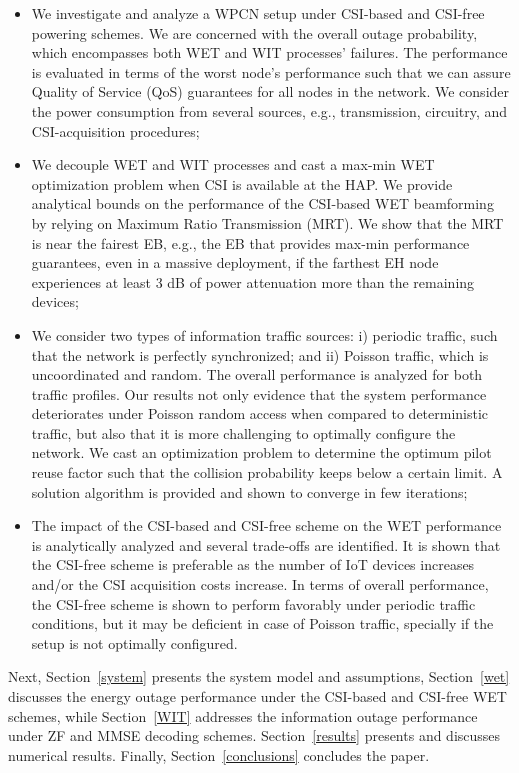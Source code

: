 \documentclass[10pt,journal,a4paper]{IEEEtran}
\begin{document}
	\begin{itemize}
		\item We investigate and analyze a WPCN setup under CSI-based and CSI-free powering schemes. We are concerned with the overall outage probability, which encompasses both WET and WIT processes' failures. 
		The performance is evaluated in terms of the worst node's performance such that we can assure Quality of Service (QoS) guarantees for all nodes in the network. We consider the power consumption from several sources, e.g., transmission, circuitry, and CSI-acquisition procedures;
		\item We decouple WET and WIT processes and cast a max-min WET optimization problem when CSI is available at the HAP. 
		We provide analytical bounds on the performance of the CSI-based WET beamforming by relying on Maximum Ratio Transmission (MRT). We show that the MRT is near the fairest EB, e.g., the EB that provides max-min performance guarantees, even in a massive deployment, if the farthest EH node experiences at least 3 dB of power attenuation more than the remaining devices;
		\item We consider two types of information traffic sources: i) periodic traffic, such that the network is perfectly synchronized; and ii) Poisson traffic, which is uncoordinated and random. The overall performance is analyzed for both traffic profiles. Our results not only evidence that the system performance deteriorates under Poisson random access when compared to deterministic traffic, but also that it is more challenging to optimally configure the network. We cast an optimization problem to determine the optimum pilot reuse factor such that the collision probability keeps below a certain limit. A solution algorithm is provided and shown to converge in few iterations;
		\item The impact of the CSI-based and CSI-free scheme on the WET performance is analytically analyzed and several trade-offs are identified. It is shown that the CSI-free scheme is preferable as the number of IoT devices increases and/or the CSI acquisition costs increase. In terms of overall performance, the CSI-free scheme is shown to perform favorably under periodic traffic conditions, but it may be deficient in case of Poisson traffic, specially if the setup is not optimally configured.
	\end{itemize}
	
	Next, Section~\ref{system} presents the system model and assumptions, Section~\ref{wet} discusses the energy outage performance under the CSI-based and CSI-free WET schemes, while Section~\ref{WIT} addresses the information outage performance under ZF and MMSE decoding schemes. Section~\ref{results} presents and discusses numerical results. Finally,
	Section~\ref{conclusions} concludes the paper.
	
\end{document}
